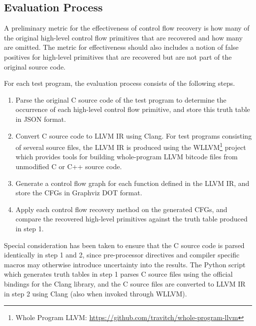 
\subsection{Evaluation Process}


A preliminary metric for the effectiveness of control flow recovery is how many of the original high-level control flow primitives that are recovered and how many are omitted. The metric for effectiveness should also includes a notion of false positives for high-level primitives that are recovered but are not part of the original source code.

For each test program, the evaluation process consists of the following steps.

\begin{enumerate}
	\item Parse the original C source code of the test program to determine the occurrence of each high-level control flow primitive, and store this truth table in JSON format.
	\item Convert C source code to LLVM IR using Clang. For test programs consisting of several source files, the LLVM IR is produced using the WLLVM\footnote{Whole Program LLVM: \url{https://github.com/travitch/whole-program-llvm}} project which provides tools for building whole-program LLVM bitcode files from unmodified C or C++ source code.
	\item Generate a control flow graph for each function defined in the LLVM IR, and store the CFGs in Graphviz DOT format.
	\item Apply each control flow recovery method on the generated CFGs, and compare the recovered high-level primitives against the truth table produced in step 1.
\end{enumerate}

Special consideration has been taken to ensure that the C source code is parsed identically in step 1 and 2, since pre-processor directives and compiler specific macros may otherwise introduce uncertainty into the results. The Python script which generates truth tables in step 1 parses C source files using the official bindings for the Clang library, and the C source files are converted to LLVM IR in step 2 using Clang (also when invoked through WLLVM).
